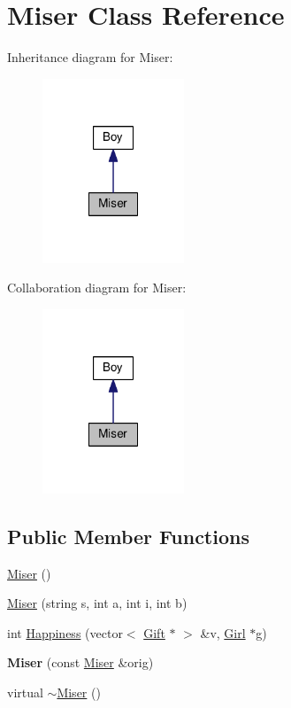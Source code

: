 \hypertarget{class_miser}{\section{Miser Class Reference}
\label{class_miser}
}


Inheritance diagram for Miser\-:
\nopagebreak
\begin{figure}[H]
\begin{center}
\leavevmode
\includegraphics[width=120pt]{class_miser__inherit__graph}
\end{center}
\end{figure}


Collaboration diagram for Miser\-:
\nopagebreak
\begin{figure}[H]
\begin{center}
\leavevmode
\includegraphics[width=120pt]{class_miser__coll__graph}
\end{center}
\end{figure}
\subsection*{Public Member Functions}
\begin{DoxyCompactItemize}
\item 
\hyperlink{class_miser_ac1fdec3c0e932ba426ff85320ab4ed4e}{Miser} ()
\item 
\hyperlink{class_miser_a05eee2c2284780062dce24bdb5c5a538}{Miser} (string s, int a, int i, int b)
\item 
int \hyperlink{class_miser_a9000a1363d85d4ef421e2a69c4120b89}{Happiness} (vector$<$ \hyperlink{class_gift}{Gift} $\ast$ $>$ \&v, \hyperlink{class_girl}{Girl} $\ast$g)
\item 
\hypertarget{class_miser_a7c5ac41f7025711f530a50b06ef5241c}{{\bfseries Miser} (const \hyperlink{class_miser}{Miser} \&orig)}\label{class_miser_a7c5ac41f7025711f530a50b06ef5241c}

\item 
virtual \hyperlink{class_miser_addc98fc8c3d7ba7eb4845124c60c1885}{$\sim$\-Miser} ()
\end{DoxyCompactItemize}
